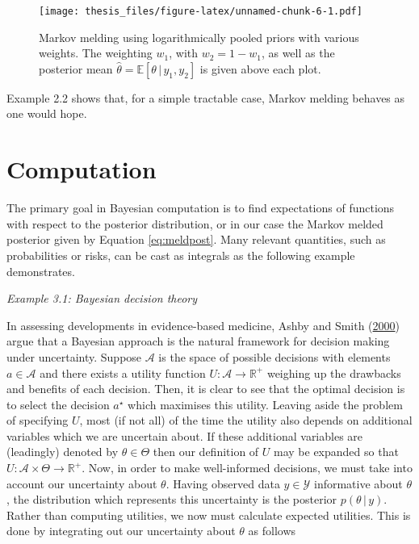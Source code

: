 \documentclass[11pt,]{book}
\begin{document}
\begin{figure}
\centering
\texttt{[image: thesis\_files/figure-latex/unnamed-chunk-6-1.pdf]}
\caption{\label{fig:unnamed-chunk-6}Markov melding using logarithmically
pooled priors with various weights. The weighting \(w_1\), with
\(w_2 = 1 - w_1\), as well as the posterior mean
\(\hat \theta = \mathbb{E}[\theta \, | \, y_1, y_2]\) is given above
each plot. \label{fig:ex1weight}}
\end{figure}

Example 2.2 shows that, for a simple tractable case, Markov melding
behaves as one would hope.

\chapter{\texorpdfstring{Computation
\label{chapter:comp}}{Computation }}\label{computation}

The primary goal in Bayesian computation is to find expectations of
functions with respect to the posterior distribution, or in our case the
Markov melded posterior given by Equation \eqref{eq:meldpost}. Many
relevant quantities, such as probabilities or risks, can be cast as
integrals as the following example demonstrates.

\emph{Example 3.1: Bayesian decision theory}

In assessing developments in evidence-based medicine, Ashby and Smith
(\protect\hyperlink{ref-ashby2000evidence}{2000}) argue that a Bayesian
approach is the natural framework for decision making under uncertainty.
Suppose \(\mathcal{A}\) is the space of possible decisions with elements
\(a \in \mathcal{A}\) and there exists a utility function
\(U: \mathcal{A} \to \mathbb{R}^+\) weighing up the drawbacks and
benefits of each decision. Then, it is clear to see that the optimal
decision is to select the decision \(a^\star\) which maximises this
utility. Leaving aside the problem of specifying \(U\), most (if not
all) of the time the utility also depends on additional variables which
we are uncertain about. If these additional variables are (leadingly)
denoted by \(\theta \in \Theta\) then our definition of \(U\) may be
expanded so that \(U: \mathcal{A} \times \Theta \to \mathbb{R}^+\). Now,
in order to make well-informed decisions, we must take into account our
uncertainty about \(\theta\). Having observed data \(y \in \mathcal{Y}\)
informative about \(\theta\), the distribution which represents this
uncertainty is the posterior \(p(\theta \, | \, y)\). Rather than
computing utilities, we now must calculate expected utilities. This is
done by integrating out our uncertainty about \(\theta\) as follows
\end{document}
